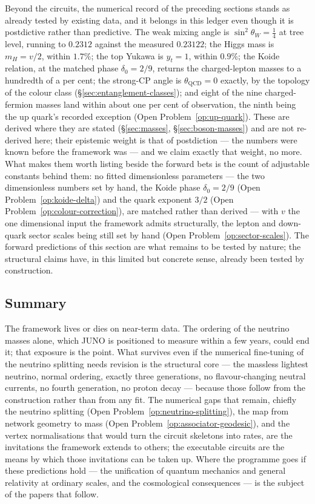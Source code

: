 Beyond the circuits, the numerical record of the preceding sections stands as already tested by
existing data, and it belongs in this ledger even though it is postdictive rather than
predictive. The weak mixing angle is $\sin^2\theta_W = \tfrac14$ at tree level, running to
$0.2312$ against the measured $0.23122$; the Higgs mass is $m_H = v/2$, within $1.7\%$; the top
Yukawa is $y_t = 1$, within $0.9\%$; the Koide relation, at the matched phase $\delta_0 = 2/9$,
returns the charged-lepton masses to a hundredth of a per cent; the strong-CP angle is
$\theta_{\mathrm{QCD}} = 0$ exactly, by the topology of the colour class
(\S\ref{sec:entanglement-classes}); and eight of the nine charged-fermion masses land within
about one per cent of observation, the ninth being the up quark's recorded exception (Open
Problem~\ref{op:up-quark}). These are derived where they are stated (\S\ref{sec:masses},
\S\ref{sec:boson-masses}) and are not re-derived here; their epistemic weight is that of
postdiction --- the numbers were known before the framework was --- and we claim exactly that
weight, no more. What makes them worth listing beside the forward bets is the count of
adjustable constants behind them: no fitted dimensionless parameters --- the two dimensionless
numbers set by hand, the Koide phase $\delta_0 = 2/9$ (Open Problem~\ref{op:koide-delta}) and
the quark exponent $3/2$ (Open Problem~\ref{op:colour-correction}), are matched rather than
derived --- with $v$ the one dimensional input the framework admits structurally, the lepton and
down-quark sector scales being still set by hand (Open Problem~\ref{op:sector-scales}). The
forward predictions of this section are what remains to be tested by nature; the structural
claims have, in this limited but concrete sense, already been tested by construction.

\subsection{Summary}

The framework lives or dies on near-term data. The ordering of the neutrino masses alone, which JUNO
is positioned to measure within a few years, could end it; that exposure is the point. What survives
even if the numerical fine-tuning of the neutrino splitting needs revision is the structural core ---
the massless lightest neutrino, normal ordering, exactly three generations, no flavour-changing
neutral currents, no fourth generation, no proton decay --- because those follow from the
construction rather than from any fit. The numerical gaps that remain, chiefly the neutrino splitting
(Open Problem~\ref{op:neutrino-splitting}), the map from network geometry to mass
(Open Problem~\ref{op:associator-geodesic}), and the vertex normalisations that would turn the
circuit skeletons into rates, are the invitations the framework extends to others; the executable
circuits are the means by which those invitations can be taken up. Where the programme goes if these
predictions hold --- the unification of quantum mechanics and general relativity at ordinary scales,
and the cosmological consequences --- is the subject of the papers that follow.
